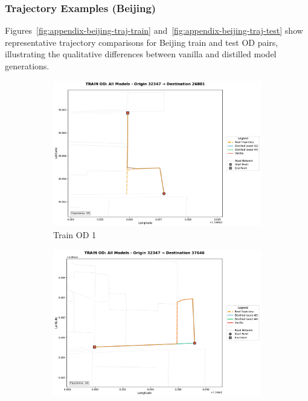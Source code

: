 \subsubsection{Trajectory Examples (Beijing)}
\label{app:traj-beijing}

Figures~\ref{fig:appendix-beijing-traj-train} and~\ref{fig:appendix-beijing-traj-test} show representative trajectory comparisons for Beijing train and test OD pairs, illustrating the qualitative differences between vanilla and distilled model generations.

\begin{figure}[H]
    \centering
    \begin{subfigure}{0.49\linewidth}
        \centering
        \includegraphics[width=\linewidth]{assets/plots/eval/beijing/trajectories/train_od_comparison_1_origin32347_dest26801.pdf}
        \caption{Train OD 1}
    \end{subfigure}
    \begin{subfigure}{0.49\linewidth}
        \centering
        \includegraphics[width=\linewidth]{assets/plots/eval/beijing/trajectories/train_od_comparison_3_origin32347_dest37646.pdf}

\end{subfigure}
\end{figure}
